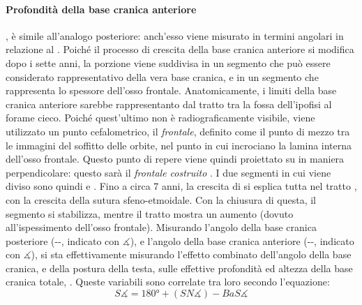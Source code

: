 \paragraph{Profondità della base cranica anteriore} , è simile all'analogo posteriore: anch'esso viene misurato in termini angolari in relazione al . Poiché il processo di crescita della base cranica anteriore si modifica dopo i sette anni, la porzione  viene suddivisa in un segmento che può essere considerato rappresentativo della vera base cranica, e in un segmento che rappresenta lo spessore dell'osso frontale. Anatomicamente, i limiti della base cranica anteriore sarebbe rappresentanto dal tratto tra la fossa dell'ipofisi al forame cieco. Poiché quest'ultimo non è radiograficamente visibile, viene utilizzato un punto cefalometrico, il \emph{frontale}, definito come il punto di mezzo tra le immagini del soffitto delle orbite, nel punto in cui incrociano la lamina interna dell'osso frontale. Questo punto di repere viene quindi proiettato su  in maniera perpendicolare: questo sarà il \emph{frontale costruito} . I due segmenti in cui viene diviso  sono quindi  e . Fino a circa 7 anni, la crescita di  si esplica tutta nel tratto , con la crescita della sutura sfeno-etmoidale. Con la chiusura di questa, il segmento  si stabilizza, mentre il tratto  mostra un aumento (dovuto all'ispessimento dell'osso frontale). Misurando l'angolo della base cranica posteriore (--, indicato con $\measuredangle$), e l'angolo della base cranica anteriore (--, indicato con $\measuredangle$), si sta effettivamente misurando l'effetto combinato dell'angolo della base cranica, e della postura della testa, sulle effettive profondità ed altezza della base cranica totale, . Queste variabili sono correlate tra loro secondo l'equazione:
\begin{equation}
S\measuredangle = 180° + (SN\measuredangle) - BaS\measuredangle
\end{equation}

